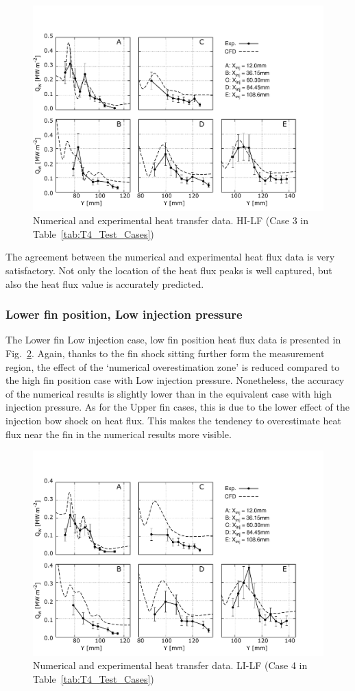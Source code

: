 \documentclass{AIAA}
\begin{document}
%
\begin{figure}[!h]
\center
\includegraphics[trim = 0mm 3mm 25mm 25mm, clip, width=0.60\columnwidth,valign=t,fbox]{Figures/Data/LP_HI_LF/GNUP_CFD_GaugesLines_Multi.pdf}
\caption{Numerical and experimental heat transfer data. HI-LF (Case 3 in Table~\ref{tab:T4_Test_Cases})}
\label{fig:HeatFluxLPHILF}
\end{figure} 

The agreement between the numerical and experimental heat flux data is very satisfactory. 
Not only the location of the heat flux peaks is well captured, but also the heat flux value is accurately predicted. 

 
\subsubsection{Lower fin position, Low injection pressure}
 
The Lower fin Low injection case, low fin position heat flux data is presented in Fig.~\ref{fig:HeatFluxLPLILF}.
Again, thanks to the fin shock sitting further form the measurement region, the effect of the `numerical overestimation zone' is reduced compared to the high fin position case with Low injection pressure. 
Nonetheless, the accuracy of the numerical results is slightly lower than in the equivalent case with high injection pressure.
As for the Upper fin cases, this is due to the lower effect of the injection bow shock on heat flux.
This makes the tendency to overestimate heat flux near the fin in the numerical results more visible. 

%
\begin{figure}[!h]
\center
\includegraphics[trim = 0mm 3mm 25mm 25mm, clip, width=0.60\columnwidth,valign=t,fbox]{Figures/Data/LP_LI_LF/GNUP_CFD_GaugesLines_Multi.pdf}
\caption{Numerical and experimental heat transfer data. LI-LF (Case 4 in Table~\ref{tab:T4_Test_Cases})}
\label{fig:HeatFluxLPLILF}
\end{figure} 
\end{document}
